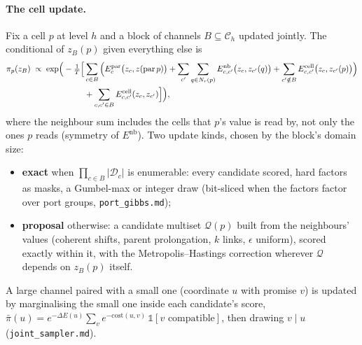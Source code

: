 \documentclass[11pt]{article}
\newcommand{\1}{\mathds{1}}
\newcommand{\Dom}{\mathcal{D}}
\newcommand{\Chan}{\mathcal{C}}
\newcommand{\Cand}{\mathcal{Q}}
\begin{document}
\paragraph{The cell update.} Fix a cell $p$ at level $h$ and a block of channels
$B \subseteq \Chan_h$ updated jointly. The conditional of $z_B(p)$ given everything
else is
\begin{align}
  \pi_p(z_B) \;\propto\; \exp\!\Big(-\tfrac1T \Big[
    &\sum_{c \in B} \Big( E^{\mathrm{par}}_c\big(z_c, z(\mathrm{par}\,p)\big)
    + \sum_{c'}\sum_{q \in N_r(p)} E^{\mathrm{nb}}_{c,c'}\big(z_c, z_{c'}(q)\big)
    + \sum_{c' \notin B} E^{\mathrm{cell}}_{c,c'}\big(z_c, z_{c'}(p)\big)\Big) \notag \\
    &+ \sum_{c, c' \in B} E^{\mathrm{cell}}_{c,c'}(z_c, z_{c'})
  \Big]\Big),
  \label{eq:cell}
\end{align}
where the neighbour sum includes the cells that $p$'s value is read by, not only
the ones $p$ reads (symmetry of $E^{\mathrm{nb}}$). Two update kinds, chosen by
the block's domain size:
\begin{itemize}
  \item \textbf{exact} when $\prod_{c \in B}|\Dom_c|$ is enumerable: every candidate
        scored, hard factors as masks, a Gumbel-max or integer draw (bit-sliced
        when the factors factor over port groups, \texttt{port\_gibbs.md});
  \item \textbf{proposal} otherwise: a candidate multiset $\Cand(p)$ built from the
        neighbours' values (coherent shifts, parent prolongation, $k$ links,
        $\epsilon$ uniform), scored exactly within it, with the
        Metropolis--Hastings correction wherever $\Cand$ depends on $z_B(p)$ itself.
\end{itemize}
A large channel paired with a small one (coordinate $u$ with promise $v$) is
updated by marginalising the small one inside each candidate's score,
$\bar\pi(u) = e^{-\Delta E(u)} \sum_v e^{-\mathrm{cost}(u,v)}\,\1[v \text{ compatible}]$,
then drawing $v \mid u$ (\texttt{joint\_sampler.md}).
\end{document}
